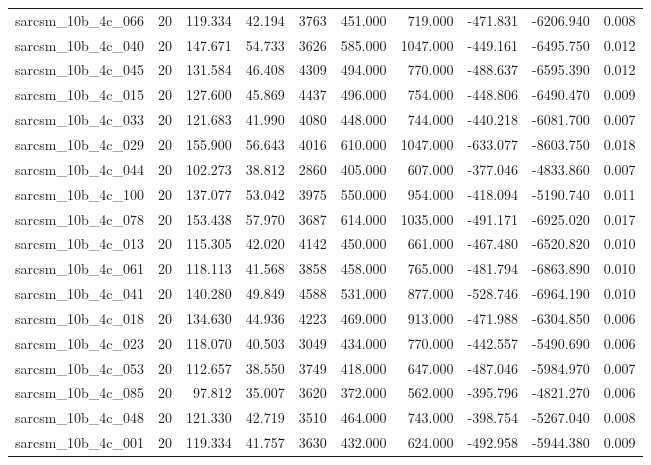 \begin{tabular}{lrrrrrrrrr}
sarcsm\_10b\_4c\_066 & 20 & 119.334 & 42.194 & 3763 & 451.000 & 719.000 & -471.831 & -6206.940 & 0.008 \\
sarcsm\_10b\_4c\_040 & 20 & 147.671 & 54.733 & 3626 & 585.000 & 1047.000 & -449.161 & -6495.750 & 0.012 \\
sarcsm\_10b\_4c\_045 & 20 & 131.584 & 46.408 & 4309 & 494.000 & 770.000 & -488.637 & -6595.390 & 0.012 \\
sarcsm\_10b\_4c\_015 & 20 & 127.600 & 45.869 & 4437 & 496.000 & 754.000 & -448.806 & -6490.470 & 0.009 \\
sarcsm\_10b\_4c\_033 & 20 & 121.683 & 41.990 & 4080 & 448.000 & 744.000 & -440.218 & -6081.700 & 0.007 \\
sarcsm\_10b\_4c\_029 & 20 & 155.900 & 56.643 & 4016 & 610.000 & 1047.000 & -633.077 & -8603.750 & 0.018 \\
sarcsm\_10b\_4c\_044 & 20 & 102.273 & 38.812 & 2860 & 405.000 & 607.000 & -377.046 & -4833.860 & 0.007 \\
sarcsm\_10b\_4c\_100 & 20 & 137.077 & 53.042 & 3975 & 550.000 & 954.000 & -418.094 & -5190.740 & 0.011 \\
sarcsm\_10b\_4c\_078 & 20 & 153.438 & 57.970 & 3687 & 614.000 & 1035.000 & -491.171 & -6925.020 & 0.017 \\
sarcsm\_10b\_4c\_013 & 20 & 115.305 & 42.020 & 4142 & 450.000 & 661.000 & -467.480 & -6520.820 & 0.010 \\
sarcsm\_10b\_4c\_061 & 20 & 118.113 & 41.568 & 3858 & 458.000 & 765.000 & -481.794 & -6863.890 & 0.010 \\
sarcsm\_10b\_4c\_041 & 20 & 140.280 & 49.849 & 4588 & 531.000 & 877.000 & -528.746 & -6964.190 & 0.010 \\
sarcsm\_10b\_4c\_018 & 20 & 134.630 & 44.936 & 4223 & 469.000 & 913.000 & -471.988 & -6304.850 & 0.006 \\
sarcsm\_10b\_4c\_023 & 20 & 118.070 & 40.503 & 3049 & 434.000 & 770.000 & -442.557 & -5490.690 & 0.006 \\
sarcsm\_10b\_4c\_053 & 20 & 112.657 & 38.550 & 3749 & 418.000 & 647.000 & -487.046 & -5984.970 & 0.007 \\
sarcsm\_10b\_4c\_085 & 20 & 97.812 & 35.007 & 3620 & 372.000 & 562.000 & -395.796 & -4821.270 & 0.006 \\
sarcsm\_10b\_4c\_048 & 20 & 121.330 & 42.719 & 3510 & 464.000 & 743.000 & -398.754 & -5267.040 & 0.008 \\
sarcsm\_10b\_4c\_001 & 20 & 119.334 & 41.757 & 3630 & 432.000 & 624.000 & -492.958 & -5944.380 & 0.009 \\

\end{tabular}
